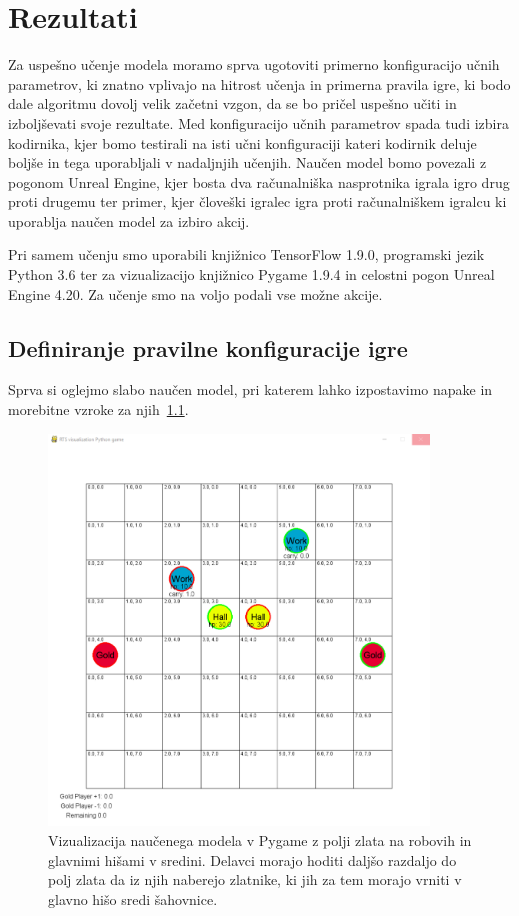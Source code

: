 \documentclass[a4paper, 12pt]{book}
\begin{document}
\chapter{Rezultati}
\label{chrezultati}

Za uspešno učenje modela moramo sprva ugotoviti primerno konfiguracijo učnih parametrov, ki znatno vplivajo na hitrost učenja in primerna pravila igre, ki bodo dale algoritmu dovolj velik začetni vzgon, da se bo pričel uspešno učiti in izboljševati svoje rezultate.
Med konfiguracijo učnih parametrov spada tudi izbira kodirnika, kjer bomo testirali na isti učni konfiguraciji kateri kodirnik deluje boljše in tega uporabljali v nadaljnjih učenjih.
Naučen model bomo povezali z pogonom Unreal Engine, kjer bosta dva računalniška nasprotnika igrala igro drug proti drugemu ter primer, kjer človeški igralec igra proti računalniškem igralcu ki uporablja naučen model za izbiro akcij.

Pri samem učenju smo uporabili knjižnico TensorFlow 1.9.0, programski jezik Python 3.6 ter za vizualizacijo knjižnico Pygame 1.9.4 in celostni pogon Unreal Engine 4.20.
Za učenje smo na voljo podali vse možne akcije.
\section{Definiranje pravilne konfiguracije igre}

Sprva si oglejmo slabo naučen model, pri katerem lahko izpostavimo napake in morebitne vzroke za njih~\ref{vizualizacijaRezultatovSpremembaZlata}.
\begin{figure}[h!]
	\begin{center}
		\includegraphics[width=0.9\textwidth]{photos/third-2018-11-14.pdf}
	\end{center}
	\caption{Vizualizacija naučenega modela v Pygame z polji zlata na robovih in glavnimi hišami v sredini. Delavci morajo hoditi daljšo razdaljo do polj zlata da iz njih naberejo zlatnike, ki jih za tem morajo vrniti v glavno hišo sredi šahovnice. }
	\label{vizualizacijaRezultatovSpremembaZlata}
\end{figure}
\end{document}
